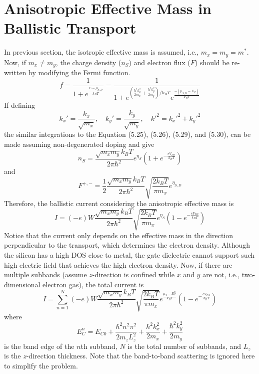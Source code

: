\section{Anisotropic Effective Mass in Ballistic Transport}
In previous section, the isotropic effective mass is assumed, i.e., $m_{x} = m_{y} = m^{*}$. Now, if $m_{x}\neq m_{y}$, the charge density ($n_{S}$) and electron flux ($F$) should be re-written by modifying the Fermi function. \begin{equation}
    f = \frac{1}{1+e^{\frac{E-\mu_{S,D}}{k_{B}T}}} = \frac{1}{1+e^{\left(\frac{\hbar^{2}k_{x}^{2}}{2m_{x}}+\frac{\hbar^{2}k_{y}^{2}}{2m_{y}}\right)/k_{B}T}e^{\frac{-(\mu_{S,D}-E_{C})}{k_{B}T}}}
\end{equation} If defining \begin{equation}
    k_{x}' = \frac{k_{x}}{\sqrt{m_{x}}},\quad k_{y}' = \frac{k_{y}}{\sqrt{m_{y}}}, \quad k'^{2} = k_{x}'^{2}+k_{y}'^{2}
\end{equation} the similar integrations to the Equation (5.25), (5.26), (5.29), and (5.30), can be made assuming non-degenerated doping and give \begin{equation}
    n_{S} = \frac{\sqrt{m_{x}m_{y}}k_{B}T}{2\pi\hbar^{2}}e^{\eta_{S}}\left(1+e^{-\frac{eV_{DS}}{k_{B}T}}\right)
\end{equation} and \begin{equation}
    F^{+,-} = \frac{1}{2}\frac{\sqrt{m_{x}m_{y}}k_{B}T}{2\pi\hbar^{2}}\sqrt{\frac{2k_{B}T}{\pi m_{x}}}e^{\eta_{S,D}}
\end{equation} Therefore, the ballistic current considering the anisotropic effective mass is \begin{equation}
    I = (-e)W\frac{\sqrt{m_{x}m_{y}}k_{B}T}{2\pi\hbar^{2}}\sqrt{\frac{2k_{B}T}{\pi m_{x}}}e^{\eta_{S}}\left(1-e^{-\frac{eV_{DS}}{k_{B}T}}\right)
\end{equation} Notice that the current only depends on the effective mass in the direction perpendicular to the transport, which determines the electron density. Although the silicon has a high DOS close to metal, the gate dielectric cannot support such high electric field that achieves the high electron density. Now, if there are multiple subbands (assume $z$-direction is confined while $x$ and $y$ are not, i.e., two-dimensional electron gas), the total current is \begin{equation}
    I = \sum_{n=1}^{N}{(-e)W\frac{\sqrt{m_{x}m_{y}}k_{B}T}{2\pi\hbar^{2}}\sqrt{\frac{2k_{B}T}{\pi m_{x}}}e^{\frac{\mu_{S}-E_{C}^{n}}{k_{B}T}}\left(1-e^{-\frac{eV_{DS}}{k_{B}T}}\right)}
\end{equation} where \begin{equation}
    E_{C}^{n} = E_{C0} + \frac{\hbar^{2}n^{2}\pi^{2}}{2m_{z}L_{z}^{2}} + \frac{\hbar^{2}k_{x}^{2}}{2m_{x}} + \frac{\hbar^{2}k_{y}^{2}}{2m_{y}}
\end{equation} is the band edge of the $n$th subband, $N$ is the total number of subbands, and $L_{z}$ is the $z$-direction thickness. Note that the band-to-band scattering is ignored here to simplify the problem.
